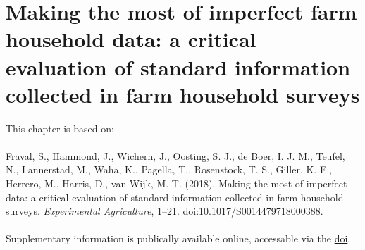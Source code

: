 \chapter[Making the most of imperfect farm household data: a critical evaluation of standard information collected in farm household surveys]{Making the most of imperfect farm household data: a critical evaluation of standard information collected in farm household surveys}
\label{cha:chapter3}
\vspace*{\fill}
This chapter is based on:
\\
\\
Fraval, S., Hammond, J., Wichern, J., Oosting, S. J., de Boer, I. J. M., Teufel, N., Lannerstad, M., Waha, K., Pagella, T., Rosenstock, T. S., Giller, K. E., Herrero, M., Harris, D., van Wijk, M. T. (2018). Making the most of imperfect data: a critical evaluation of standard information collected in farm household surveys. \textit{Experimental Agriculture}, 1–21. doi:10.1017/S0014479718000388.
\\
\\
Supplementary information is publically available online, accessable via the \href{https://doi.org/10.1017/S0014479718000388}{doi}.


\newpage

